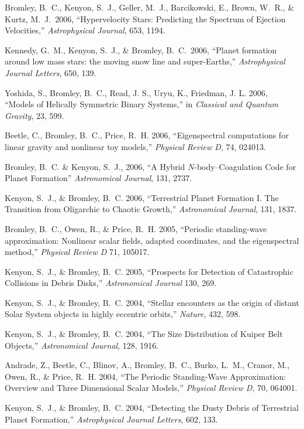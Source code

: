 \documentclass[11pt]{article}
\def\refitem{} %
\begin{document}
\refitem Bromley, B.~C., Kenyon, S.~J., Geller, M.~J., Barcikowski,
E., Brown, W.~R., \& Kurtz, M.~J.\ 2006, ``Hypervelocity Stars:
Predicting the Spectrum of Ejection Velocities,'' {\em Astrophysical
  Journal}, 653, 1194.

\refitem Kennedy, G.~M., Kenyon, S.~J., \& Bromley, B.~C.\ 2006,
``Planet formation around low mass stars: the moving snow line and
super-Earths,'' {\em Astrophysical Journal Letters}, 650, 139.

\refitem Yoshida, S., Bromley, B.~C., Read, J. S., Uryu, K., Friedman,
J. L.  2006, ``Models of Helically Symmetric Binary Systems,'' in {\em
  Classical and Quantum Gravity}, 23, 599.

\refitem Beetle, C., Bromley, B.~C., Price, R.~H. 2006,
``Eigenspectral computations for linear gravity and nonlinear toy
models,'' {\em Physical Review D}, 74, 024013.

\refitem Bromley, B.~C.  \& Kenyon, S.~J., 2006, ``A Hybrid
$N$-body--Coagulation Code for Planet Formation'' {\em Astronomical
  Journal}, 131, 2737.

\refitem Kenyon, S.~J., \& Bromley, B.~C. 2006, ``Terrestrial Planet
Formation I. The Transition from Oligarchic to Chaotic Growth,'' {\em
  Astronomical Journal}, 131, 1837.


\refitem Bromley, B.~C., Owen, R., \& Price, R.~H. 2005, ``Periodic
standing-wave approximation: Nonlinear scalar fields, adapted
coordinates, and the eigenspectral method,'' {\em Physical Review D}
71, 105017.


\refitem Kenyon, S.~J., \& Bromley, B.~C. 2005, ``Prospects for
Detection of Catastrophic Collisions in Debris Disks,'' {\em
  Astronomical Journal} 130, 269.

\refitem Kenyon, S.~J., \& Bromley, B.~C. 2004, ``Stellar encounters
as the origin of distant Solar System objects in highly eccentric
orbits,'' {\em Nature}, 432, 598.


\refitem Kenyon, S.~J., \& Bromley, B.~C. 2004, ``The Size
Distribution of Kuiper Belt Objects,'' {\em Astronomical Journal},
128, 1916.

\refitem Andrade, Z., Beetle, C., Blinov, A., Bromley, B.~C., Burko,
L.~M., Cranor, M., Owen, R., \& Price, R.~H. 2004, ``The Periodic
Standing-Wave Approximation: Overview and Three Dimensional Scalar
Models,'' {\em Physical Review D}, 70, 064001.

\refitem Kenyon, S.~J., \& Bromley, B.~C. 2004, ``Detecting the Dusty
Debris of Terrestrial Planet Formation,'' {\em Astrophysical Journal
  Letters}, 602, 133.
\end{document}
